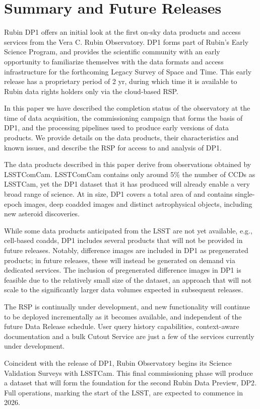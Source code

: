 \section{Summary and Future Releases}
\label{sec:summary}

Rubin \gls{DP1} offers an initial look at the first on-sky data products and access services from the Vera C. Rubin Observatory. \gls{DP1} forms part of Rubin's Early Science Program, and provides the scientific community with an early opportunity to familiarize themselves with the data formats and access infrastructure for the forthcoming Legacy Survey of Space and Time.
This early release has a proprietary period of 2 yr, during which time it is  available to Rubin data rights holders only via the cloud-based \gls{RSP}.

In this paper we have described the completion status of the observatory at the time of data acquisition, the commissioning campaign that forms the basis of \gls{DP1}, and the processing pipelines used to produce early versions of data products.
We provide details on the data products, their characteristics and known issues, and describe the \gls{RSP} for access to and analysis of \gls{DP1}.

The data products described in this paper derive from observations obtained by \gls{LSSTComCam}. 
\gls{LSSTComCam} contains only around 5\% the number of CCDs as \gls{LSSTCam}, yet the \gls{DP1} dataset that it has produced will already enable a very broad range of science.
At \sizeinbytes in size, \gls{DP1} covers a total area of \totalarea and contains \nexposures single-epoch images, \ndeepcoadds deep coadded images and \nobjects distinct astrophysical objects, including  \nnewasteroiddiscoveries  new asteroid discoveries.

While some data products anticipated from the \gls{LSST} are not yet available, e.g., cell-based coadds, \gls{DP1} includes several products that will not be provided in future releases.
Notably, difference images are included in \gls{DP1} as pregenerated products; in future releases, these will instead be generated on demand via dedicated services.
The inclusion of pregenerated difference images in \gls{DP1} is feasible due to the relatively small size of the dataset, an approach that will not scale to the significantly larger data volumes expected in subsequent releases.

The \gls{RSP} is continually under development, and new functionality will continue to be deployed incrementally as it becomes available, and independent of the future Data Release schedule.
User query history capabilities, context-aware documentation and a bulk Cutout Service are just a few of the services currently under development.

Coincident with the release of \gls{DP1}, Rubin Observatory begins its Science Validation Surveys with  \gls{LSSTCam}.
This final commissioning phase will produce a dataset that will form the foundation for the second Rubin Data Preview, \gls{DP2}.
Full operations, marking the start of the \gls{LSST}, are expected to commence in 2026.